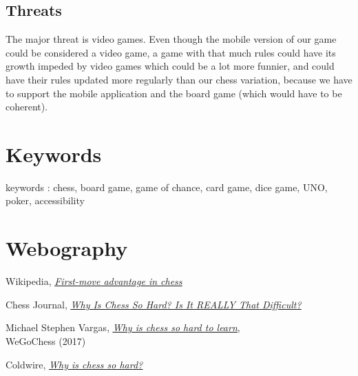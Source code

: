 \documentclass[12pt]{article}
\begin{document}
        \subsection{Threats} 
            The major threat is video games. Even though the mobile version of our game could be considered a video game, a game with that much rules could have its growth impeded by video games which could be a lot more funnier, and could have their rules updated more regularly than our chess variation, because we have to support the mobile application and the board game (which would have to be coherent).

    \section{Keywords}
        keywords : chess, board game, game of chance, card game, dice game, UNO, poker, accessibility
    
    \section{Webography}
        \begin{thebibliography}{9}
                Wikipedia, \textit{\href{https://en.wikipedia.org/wiki/First-move_advantage_in_chess}{\underline{First-move advantage in chess}} }
                
                Chess Journal, \textit{\href{https://www.chessjournal.com/why-is-chess-so-hard/}{\underline{Why Is Chess So Hard? Is It REALLY That Difficult?}} }
            
                Michael Stephen Vargas, \href{
        https://wegochess.com/why-is-chess-so-hard-to-learn/}{\underline{\textit{Why is chess so hard to learn}}},
                \\WeGoChess (2017)
            
                Coldwire,
                \href{https://www.thecoldwire.com/why-is-chess-so-hard/}{\underline{\textit{Why is chess so hard?}}}
        \end{thebibliography}
\end{document}

